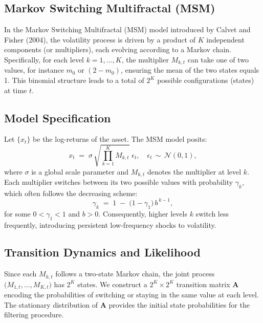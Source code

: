 \documentclass[11pt]{extarticle}
\begin{document}
\subsection{Markov Switching Multifractal (MSM)}
\label{sec:msm}

In the Markov Switching Multifractal (MSM) model introduced by Calvet and Fisher (2004), the volatility process is driven by a product of $K$ independent components (or multipliers), each evolving according to a Markov chain. Specifically, for each level $k = 1, \ldots, K$, the multiplier $M_{k,t}$ can take one of two values, for instance $m_0$ or $(2 - m_0)$, ensuring the mean of the two states equals 1. This binomial structure leads to a total of $2^K$ possible configurations (states) at time $t$.

\subsection{Model Specification}
Let $\{ x_t \}$ be the log-returns of the asset. The MSM model posits:
\begin{equation}
    x_t \;=\; \sigma \,\sqrt{\prod_{k=1}^K M_{k,t}} \;\epsilon_t,\quad
    \epsilon_t \,\sim\, \mathcal{N}(0,1),
\end{equation}
where $\sigma$ is a global scale parameter and $M_{k,t}$ denotes the multiplier at level $k$. Each multiplier switches between its two possible values with probability $\gamma_k$, which often follows the decreasing scheme:
\begin{equation}
    \gamma_k \;=\; 1 \;-\; \bigl(1 - \gamma_1\bigr)\,b^{\,k-1},
\end{equation}
for some $0 < \gamma_1 < 1$ and $b > 0$. Consequently, higher levels $k$ switch less frequently, introducing persistent low-frequency shocks to volatility.

\subsection{Transition Dynamics and Likelihood}
Since each $M_{k,t}$ follows a two-state Markov chain, the joint process $\bigl(M_{1,t}, \dots, M_{K,t}\bigr)$ has $2^K$ states. We construct a $2^K \times 2^K$ transition matrix $\mathbf{A}$ encoding the probabilities of switching or staying in the same value at each level. The stationary distribution of $\mathbf{A}$ provides the initial state probabilities for the filtering procedure.
\end{document}

